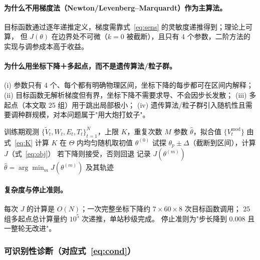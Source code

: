 \documentclass[11pt,a4paper]{ctexart}
\begin{document}
\paragraph{为什么不用梯度法（Newton/Levenberg--Marquardt）作为主算法。}
目标函数通过逐年递推定义，梯度需靠式~\eqref{eq:sens} 的灵敏度递推得到；理论上可算，
但 $J(\theta)$ 在边界处不可微（$k=0$ 被截断），且只有 4 个参数，二阶方法的实现与调参成本高于收益。

\paragraph{为什么用坐标下降＋多起点，而不是遗传算法/粒子群。}
(i) 参数只有 4 个、每个都有明确物理区间，坐标下降的每步都可在区间内解释；
(ii) 目标函数无解析梯度但有界，坐标下降不需要求导、不会因步长发散；
(iii) 多起点（本文取 25 组）用于跳出局部极小；
(iv) 遗传算法/粒子群引入随机性且需要调种群规模，对本问题属于"用大炮打蚊子"。

\begin{algorithm}[H]
\caption{任务一参数标定（坐标下降＋多起点）}\label{alg:t1}
\begin{algorithmic}[1]
\Require 训练期观测 $\{\tilde V_t,W_t,E_t,T_t\}_{t=1}^{N}$，上限 $K$，重复次数 $M$
\Ensure 参数 $\hat\theta$，拟合值 $\{V_t^{\mathrm{mod}}\}$
\State 由式~\eqref{eq:K} 计算 $K$
  \State 在 $\Theta$ 内均匀随机取初值 $\theta^{(0)}$
    \Repeat
        \State 试探 $\theta_p\pm\Delta$（截断到区间），计算 $J$（式~\eqref{eq:obj}）
        \State 若下降则接受，否则回退
      \EndFor
  \EndFor
  \State 记录 $J(\theta^{(m)})$
\EndFor
\State \Return $\hat\theta=\arg\min_m J(\theta^{(m)})$ 及其轨迹
\end{algorithmic}
\end{algorithm}

\paragraph{复杂度与停止准则。}每次 $J$ 的计算是 $O(N)$；一次完整坐标下降约 $7\times60\times8$ 次目标函数调用；
25 组多起点总计算量约 $10^{5}$ 次递推，单站秒级完成。
停止准则为"步长降到 $0.008$ 且一整轮无改进"。

\subsubsection{可识别性诊断（对应式~\eqref{eq:cond}）}\label{sec:diag}
\end{document}
